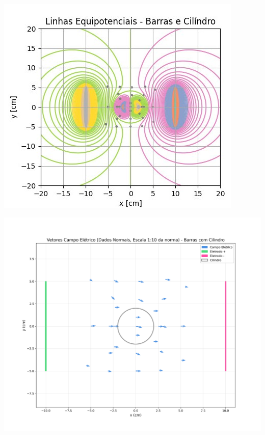\documentclass[column,brazilian,12pt,a4paper,final]{article}
\begin{document}
    \vskip 0.5cm %
    
    \begin{minipage}{0.48\textwidth}
        \centering
        \includegraphics[width=\linewidth]{EP3.jpg}
        \label{fig:imagem5}
    \end{minipage} \hfill
    \begin{minipage}{0.48\textwidth}
        \centering
        \includegraphics[width=\linewidth]{Campo CilindroN.png}
        \label{fig:imagem6}
    \end{minipage}
\end{document}
